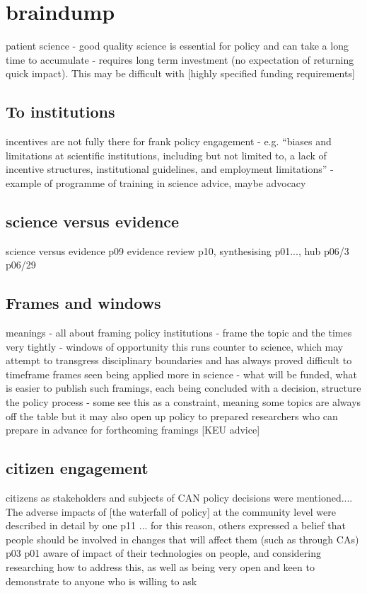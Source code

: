
\iffalse
\section{braindump}

patient science - good quality science is essential for policy and can take a long time to accumulate - requires long term investment (no expectation of returning quick impact). This may be difficult with [highly specified funding requirements]

\subsection{To institutions}
incentives are not fully there for frank policy engagement - e.g. \cite{ElsensohnACDGGKPRS2019} ``biases and limitations at scientific institutions, including but not limited to, a lack of incentive structures, institutional guidelines, and employment limitations'' - example of programme of training in science advice, maybe advocacy \cite{RussellWC2008}

\subsection{science versus evidence}
science versus evidence p09
evidence review p10, synthesising p01..., hub p06/3 p06/29

\subsection{Frames and windows}
meanings - all about framing
policy institutions - frame the topic and the times very tightly - windows of opportunity
this runs counter to science, which may attempt to transgress disciplinary boundaries and has always proved difficult to timeframe
frames seen being applied more in science - what will be funded, what is easier to publish
such framings, each being concluded with a decision, structure the policy process
- some see this as a constraint, meaning some topics are always off the table but it may also open up policy to prepared researchers who can prepare in advance for forthcoming framings [KEU advice]

\subsection{citizen engagement}
citizens as stakeholders and subjects of CAN policy decisions were mentioned.... The adverse impacts of [the waterfall of policy] at the community level were described in detail by one p11 ... for this reason, others expressed a belief that people should be involved in changes that will affect them (such as through CAs) p03  p01 aware of impact of their technologies on people, and considering researching how to address this, as well as being very open and keen to demonstrate to anyone who is willing to ask

